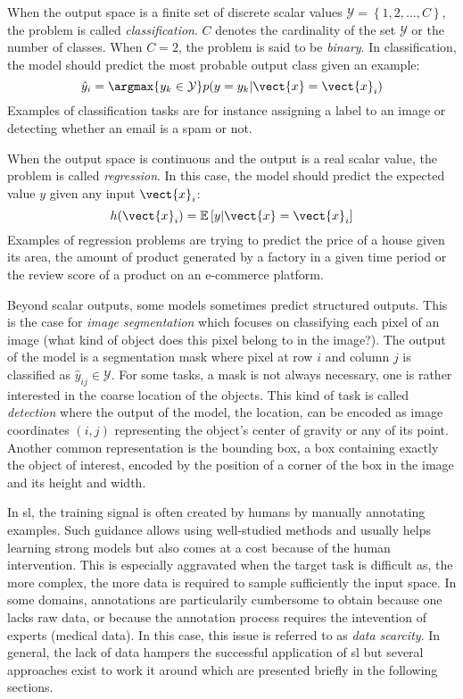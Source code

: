 When the output space is a finite set of discrete scalar values $\mathcal{Y} = \left\{1, 2, ..., C\right\}$, the problem is called \textit{classification}. $C$ denotes the cardinality of the set $\mathcal{Y}$ or the number of classes. When $C = 2$, the problem is said to be \textit{binary}. In classification, the model should predict the most probable output class given an example:
\begin{equation}
\hat{y}_i = \argmax{y_k \in \mathcal{Y}} p(y=y_k|\vect{x}=\vect{x}_i)
\end{equation}
Examples of classification tasks are for instance assigning a label to an image or detecting whether an email is a spam or not. 

When the output space is continuous and the output is a real scalar value, the problem is called \textit{regression}. In this case, the model should predict the expected value $y$ given any input $\vect{x}_i$:
\begin{equation}
h(\vect{x}_i) = \mathbb{E}\left[y|\vect{x}=\vect{x}_i\right]
\end{equation}
Examples of regression problems are trying to predict the price of a house given its area, the amount of product generated by a factory in a given time period or the review score of a product on an e-commerce platform. 

Beyond scalar outputs, some models sometimes predict structured outputs. This is the case for \textit{image segmentation} which focuses on classifying each pixel of an image (\ie what kind of object does this pixel belong to in the image?). The output of the model is a segmentation mask where pixel at row $i$ and column $j$ is classified as $\hat{y}_{ij} \in \mathcal{Y}$. For some tasks, a mask is not always necessary, one is rather interested in the coarse location of the objects. This kind of task is called \textit{detection} where the output of the model, the location, can be encoded as image coordinates $(i, j)$ representing the object's center of gravity or any of its point. Another common representation is the bounding box, a box containing exactly the object of interest, encoded by the position of a corner of the box in the image and its height and width.

In \acrlong{sl}, the training signal is often created by humans by manually annotating examples. Such guidance allows using well-studied methods and usually helps learning strong models but also comes at a cost because of the human intervention. This is especially aggravated when the target task is difficult as, the more complex, the more data is required to sample sufficiently the input space. In some domains, annotations are particularily cumbersome to obtain because one lacks raw data, or because the annotation process requires the intevention of experts (\eg medical data). In this case, this issue is referred to as \textit{data scarcity}. In general, the lack of data hampers the successful application of \acrlong{sl} but several approaches exist to work it around which are presented briefly in the following sections. 


